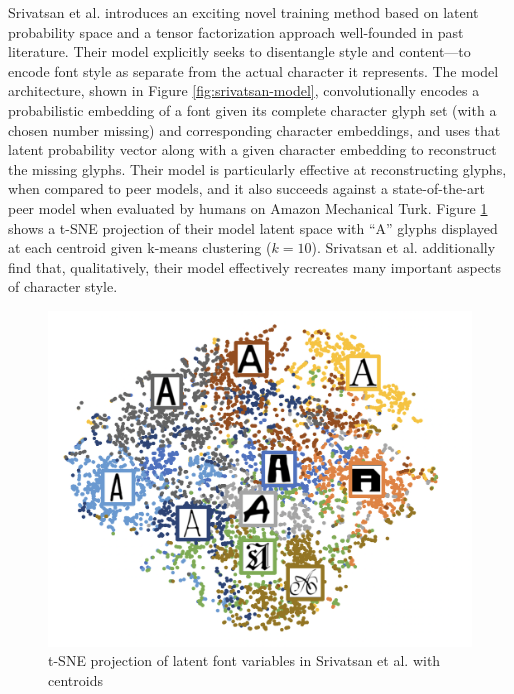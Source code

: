 Srivatsan et al. \cite{srivatsan2020} introduces an exciting novel training method based on latent probability space and a tensor factorization approach well-founded in past literature. Their model explicitly seeks to disentangle style and content—to encode font style as separate from the actual character it represents. The model architecture, shown in Figure \ref{fig:srivatsan-model}, convolutionally encodes a probabilistic embedding of a font given its complete character glyph set (with a chosen number missing) and corresponding character embeddings, and uses that latent probability vector along with a given character embedding to reconstruct the missing glyphs. Their model is particularly effective at reconstructing glyphs, when compared to peer models, and it also succeeds against a state-of-the-art peer model when evaluated by humans on Amazon Mechanical Turk. Figure \ref{fig:srivatsan-latent} shows a t-SNE projection of their model latent space with ``A'' glyphs displayed at each centroid given k-means clustering ($k=10$). Srivatsan et al. additionally find that, qualitatively, their model effectively recreates many important aspects of character style.

\begin{figure}
    \centering
    \includegraphics[width=.6\textwidth]{images/srivatsan-latent.png}
    \caption{t-SNE projection of latent font variables in Srivatsan et al. with centroids}
    \label{fig:srivatsan-latent}
\end{figure}